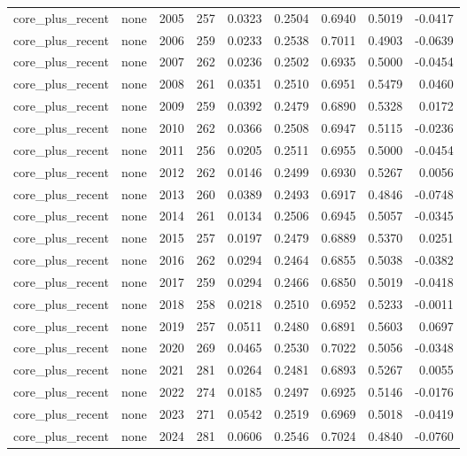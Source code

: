 \begin{table}[t]
\begin{tabular}{@{} l l r r r r r r r @{} }
      core\_plus\_recent & none & 2005 & 257 & 0.0323 & 0.2504 & 0.6940 & 0.5019 & -0.0417 \\
      core\_plus\_recent & none & 2006 & 259 & 0.0233 & 0.2538 & 0.7011 & 0.4903 & -0.0639 \\
      core\_plus\_recent & none & 2007 & 262 & 0.0236 & 0.2502 & 0.6935 & 0.5000 & -0.0454 \\
      core\_plus\_recent & none & 2008 & 261 & 0.0351 & 0.2510 & 0.6951 & 0.5479 & 0.0460 \\
      core\_plus\_recent & none & 2009 & 259 & 0.0392 & 0.2479 & 0.6890 & 0.5328 & 0.0172 \\
      core\_plus\_recent & none & 2010 & 262 & 0.0366 & 0.2508 & 0.6947 & 0.5115 & -0.0236 \\
      core\_plus\_recent & none & 2011 & 256 & 0.0205 & 0.2511 & 0.6955 & 0.5000 & -0.0454 \\
      core\_plus\_recent & none & 2012 & 262 & 0.0146 & 0.2499 & 0.6930 & 0.5267 & 0.0056 \\
      core\_plus\_recent & none & 2013 & 260 & 0.0389 & 0.2493 & 0.6917 & 0.4846 & -0.0748 \\
      core\_plus\_recent & none & 2014 & 261 & 0.0134 & 0.2506 & 0.6945 & 0.5057 & -0.0345 \\
      core\_plus\_recent & none & 2015 & 257 & 0.0197 & 0.2479 & 0.6889 & 0.5370 & 0.0251 \\
      core\_plus\_recent & none & 2016 & 262 & 0.0294 & 0.2464 & 0.6855 & 0.5038 & -0.0382 \\
      core\_plus\_recent & none & 2017 & 259 & 0.0294 & 0.2466 & 0.6850 & 0.5019 & -0.0418 \\
      core\_plus\_recent & none & 2018 & 258 & 0.0218 & 0.2510 & 0.6952 & 0.5233 & -0.0011 \\
      core\_plus\_recent & none & 2019 & 257 & 0.0511 & 0.2480 & 0.6891 & 0.5603 & 0.0697 \\
      core\_plus\_recent & none & 2020 & 269 & 0.0465 & 0.2530 & 0.7022 & 0.5056 & -0.0348 \\
      core\_plus\_recent & none & 2021 & 281 & 0.0264 & 0.2481 & 0.6893 & 0.5267 & 0.0055 \\
      core\_plus\_recent & none & 2022 & 274 & 0.0185 & 0.2497 & 0.6925 & 0.5146 & -0.0176 \\
      core\_plus\_recent & none & 2023 & 271 & 0.0542 & 0.2519 & 0.6969 & 0.5018 & -0.0419 \\
      core\_plus\_recent & none & 2024 & 281 & 0.0606 & 0.2546 & 0.7024 & 0.4840 & -0.0760 \\

\end{tabular}
\end{table}

